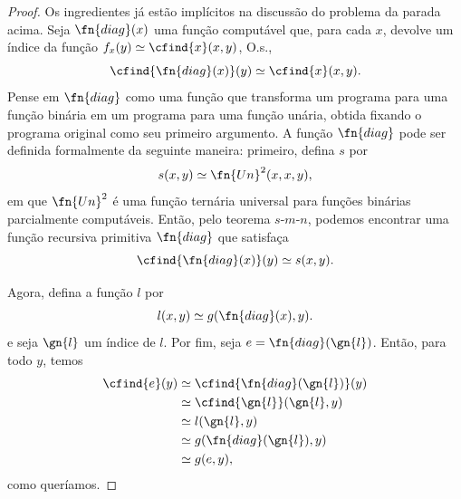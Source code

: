 \documentclass[../../../include/open-logic-section]{subfiles}
\begin{document}
\begin{proof}
Os ingredientes já estão implícitos na discussão do problema da parada
acima. Seja $\fn{diag}(x)$ uma função computável que, para cada $x$,
devolve um índice da função
$f_x(y) \simeq \cfind{x}(x,y)$, O.s.\@,
\[
\cfind{\fn{diag}(x)}(y) \simeq \cfind{x}(x,y).
\]
Pense em $\fn{diag}$ como uma função que transforma um programa para
uma função binária em um programa para uma função unária, obtida
fixando o programa original como seu primeiro argumento. A função
$\fn{diag}$ pode ser definida formalmente da seguinte maneira:
primeiro, defina $s$ por
\[
s(x,y) \simeq \fn{Un}^2(x,x,y),
\]
em que $\fn{Un}^2$ é uma função ternária universal para funções binárias
parcialmente computáveis. Então, pelo teorema $s$-$m$-$n$, podemos
encontrar uma função recursiva primitiva $\fn{diag}$ que satisfaça
\[
\cfind{\fn{diag}(x)}(y) \simeq s(x,y).
\]

Agora, defina a função $l$ por
\[
l(x,y) \simeq g(\fn{diag}(x),y).
\]
e seja $\gn{l}$ um índice de $l$. Por fim, seja
$e = \fn{diag}(\gn{l})$. Então, para todo $y$, temos
\begin{align*}
\cfind{e}(y) & \simeq \cfind{\fn{diag}(\gn{l})}(y) \\
& \simeq \cfind{\gn{l}}(\gn{l}, y) \\
& \simeq l(\gn{l}, y) \\
& \simeq g(\fn{diag}(\gn{l}),y) \\
& \simeq g(e, y),
\end{align*}
como queríamos.
\end{proof}
\end{document}
